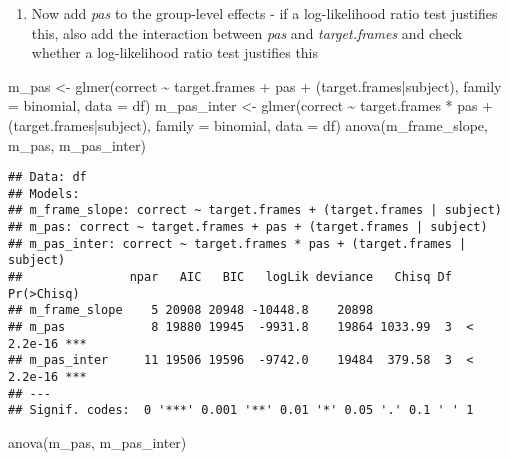 \documentclass[
]{article}
\newenvironment{Shaded}{\begin{snugshade}}{\end{snugshade}}
\newcommand{\AttributeTok}[1]{\textcolor[rgb]{0.77,0.63,0.00}{#1}}
\newcommand{\FunctionTok}[1]{\textcolor[rgb]{0.00,0.00,0.00}{#1}}
\newcommand{\NormalTok}[1]{#1}
\newcommand{\OtherTok}[1]{\textcolor[rgb]{0.56,0.35,0.01}{#1}}
\newcommand{\SpecialCharTok}[1]{\textcolor[rgb]{0.00,0.00,0.00}{#1}}
\providecommand{\tightlist}{%
  \setlength{\itemsep}{0pt}\setlength{\parskip}{0pt}}
\begin{document}
\begin{enumerate}
\def\labelenumi{\arabic{enumi})}
\setcounter{enumi}{2}
\tightlist
\item
  Now add \emph{pas} to the group-level effects - if a log-likelihood
  ratio test justifies this, also add the interaction between \emph{pas}
  and \emph{target.frames} and check whether a log-likelihood ratio test
  justifies this
\end{enumerate}

\begin{Shaded}
\begin{Highlighting}[]
\NormalTok{m\_pas }\OtherTok{\textless{}{-}} \FunctionTok{glmer}\NormalTok{(correct }\SpecialCharTok{\textasciitilde{}}\NormalTok{ target.frames }\SpecialCharTok{+}\NormalTok{ pas }\SpecialCharTok{+}\NormalTok{ (target.frames}\SpecialCharTok{|}\NormalTok{subject), }\AttributeTok{family =}\NormalTok{ binomial, }\AttributeTok{data =}\NormalTok{ df)}
\NormalTok{m\_pas\_inter }\OtherTok{\textless{}{-}} \FunctionTok{glmer}\NormalTok{(correct }\SpecialCharTok{\textasciitilde{}}\NormalTok{ target.frames }\SpecialCharTok{*}\NormalTok{ pas }\SpecialCharTok{+}\NormalTok{ (target.frames}\SpecialCharTok{|}\NormalTok{subject), }\AttributeTok{family =}\NormalTok{ binomial, }\AttributeTok{data =}\NormalTok{ df)}
\FunctionTok{anova}\NormalTok{(m\_frame\_slope, m\_pas, m\_pas\_inter)}
\end{Highlighting}
\end{Shaded}

\begin{verbatim}
## Data: df
## Models:
## m_frame_slope: correct ~ target.frames + (target.frames | subject)
## m_pas: correct ~ target.frames + pas + (target.frames | subject)
## m_pas_inter: correct ~ target.frames * pas + (target.frames | subject)
##               npar   AIC   BIC   logLik deviance   Chisq Df Pr(>Chisq)    
## m_frame_slope    5 20908 20948 -10448.8    20898                          
## m_pas            8 19880 19945  -9931.8    19864 1033.99  3  < 2.2e-16 ***
## m_pas_inter     11 19506 19596  -9742.0    19484  379.58  3  < 2.2e-16 ***
## ---
## Signif. codes:  0 '***' 0.001 '**' 0.01 '*' 0.05 '.' 0.1 ' ' 1
\end{verbatim}

\begin{Shaded}
\begin{Highlighting}[]
\FunctionTok{anova}\NormalTok{(m\_pas, m\_pas\_inter)}
\end{Highlighting}
\end{Shaded}
\end{document}
